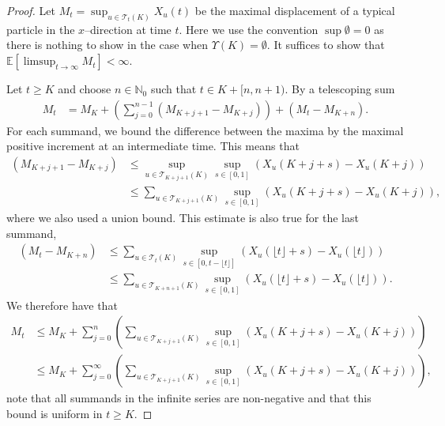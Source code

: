 \documentclass{article}
\theoremstyle{definition}
\numberwithin{equation}{section}
\numberwithin{thm}{section}
\newcommand*{\NN}{\ensuremath{\mathbb{N}}}		        %
\newcommand*{\EE}{\ensuremath{\mathbb{E}}}	        	%
\begin{document}
\begin{proof}
    Let $M_t = \sup_{u \in \mathcal{T}_t(K)} X_u(t)$ be the maximal displacement of a typical particle in the $x$--direction at time $t$. Here we use the convention $\sup \emptyset =0$ as there is nothing to show in the case when $\Upsilon(K)=\emptyset$. It suffices to show that $\EE[\limsup_{t \to \infty}M_t]<\infty$.

    Let $t\geq K$ and choose $n\in \NN_0$ such that $t\in K+[n,n+1)$. By a telescoping sum
    \begin{align}
        M_{t} &= M_K + \left(\sum_{j=0}^{n-1} (M_{K+j+1}-M_{K+j}) \right)+ (M_t-M_{K+n}). \nonumber
    \end{align}
    For each summand, we bound the difference between the maxima by the maximal positive increment at an intermediate time. This means that
    \begin{align}
         (M_{K+j+1}-M_{K+j}) &\leq \sup_{u\in \mathcal{T}_{K+j+1}(K)}\sup_{s\in[0,1]} \left(X_u(K+j+s)-X_u(K+j)\right) \nonumber\\
         &\leq \sum_{u\in \mathcal{T}_{K+j+1}(K)}\sup_{s\in[0,1]} \left(X_u(K+j+s)-X_u(K+j)\right), \nonumber
    \end{align}
    where we also used a union bound. This estimate is also true for the last summand,
    \begin{align*}
         (M_{t}-M_{K+n}) &\leq \sum_{u\in \mathcal{T}_{t}(K)}\sup_{s\in[0,t-\lfloor t\rfloor]} \left(X_u(\lfloor t\rfloor +s)-X_u(\lfloor t\rfloor)\right)\\
         &\leq \sum_{u\in \mathcal{T}_{K+n+1}(K)}\sup_{s\in[0,1]} \left(X_u(\lfloor t\rfloor+s)-X_u(\lfloor t\rfloor)\right).
    \end{align*}
    We therefore have that
    \begin{align}
        M_t &\leq M_K + \sum_{j=0}^{n} \left(\sum_{u\in \mathcal{T}_{K+j+1}(K)}\sup_{s\in[0,1]} \left(X_u(K+j+s)-X_u(K+j)\right)\right)\nonumber \\
        &\leq M_K+\sum_{j=0}^\infty \left(\sum_{u\in \mathcal{T}_{K+j+1}(K)}\sup_{s\in[0,1]} \left(X_u(K+j+s)-X_u(K+j)\right)\right), \label{epp}
    \end{align}
    note that all summands in the infinite series are non-negative and that this bound is uniform in $t\geq K$. 


\end{proof}
\end{document}
